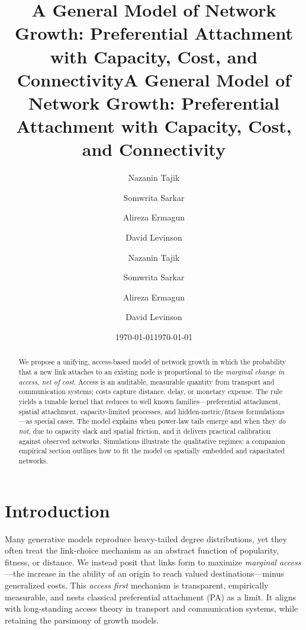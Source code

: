 \documentclass{article}[12pt]
\title{A General Model of Network Growth: Preferential Attachment with Capacity, Cost, and Connectivity}
\author{Nazanin Tajik  \and Somwrita Sarkar \and Alireza Ermagun \and David Levinson }
\date{\today}
\begin{document}
\title{A General Model of Network Growth: Preferential Attachment with Capacity, Cost, and Connectivity}
\author{Nazanin Tajik  \and Somwrita Sarkar \and Alireza Ermagun \and David Levinson}
\date{\today}
\maketitle

\begin{abstract}
We propose a unifying, access-based model of network growth in which the probability that a new link attaches to an existing node is proportional to the \emph{marginal change in access, net of cost}.  Access is an auditable, measurable quantity from transport and communication systems; costs capture distance, delay, or monetary expense.  The rule yields a tunable kernel that reduces to well known families---preferential attachment, spatial attachment, capacity-limited processes, and hidden-metric/fitness formulations---as special cases.  The model explains when power-law tails emerge and when they \emph{do not}, due to capacity slack and spatial friction, and it delivers practical calibration against observed networks.  Simulations illustrate the qualitative regimes; a companion empirical section outlines how to fit the model on spatially embedded and capacitated networks. 
\end{abstract}

\section{Introduction}
Many generative models reproduce heavy-tailed degree distributions, yet they often treat the link-choice mechanism as an abstract function of popularity, fitness, or distance.  We instead posit that links form to maximize \emph{marginal access}---the increase in the ability of an origin to reach valued destinations---minus generalized costs.  This \emph{access first} mechanism is transparent, empirically measurable, and nests classical preferential attachment (PA) as a limit.  It aligns with long-standing access theory in transport and communication systems, while retaining the parsimony of growth models.
\end{document}
